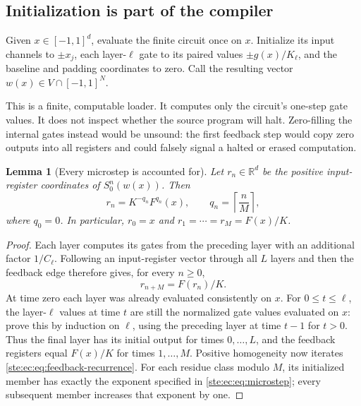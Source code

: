 \documentclass[11pt,letterpaper]{article}
\newtheorem{lemma}[theorem]{Lemma}
\theoremstyle{definition}
\theoremstyle{remark}
\newcommand{\R}{\mathbb R}
\begin{document}
\subsection{Initialization is part of the compiler}

Given $x\in[-1,1]^d$, evaluate the finite circuit once on $x$. Initialize
its input channels to $\pm x_j$, each layer-$\ell$ gate to its paired
values $\pm g(x)/K_\ell$, and the baseline and padding coordinates to
zero. Call the resulting vector $w(x)\in V\cap[-1,1]^N$.

This is a finite, computable loader. It computes only the circuit's
one-step gate values. It does not inspect whether the source program will
halt. Zero-filling the internal gates instead would be unsound: the first
feedback step would copy zero outputs into all registers and could falsely
signal a halted or erased computation.

\begin{lemma}[Every microstep is accounted for]
\label{ste:ec:lem:pipeline}
Let $r_n\in\R^d$ be the positive input-register coordinates of
$S_0^n(w(x))$. Then
\begin{equation}
 r_n=K^{-q_n}F^{q_n}(x),\qquad
 q_n=\left\lceil\frac nM\right\rceil,
 \label{ste:ec:eq:microstep}
\end{equation}
where $q_0=0$. In particular,
$r_0=x$ and $r_1=\cdots=r_M=F(x)/K$.
\end{lemma}

\begin{proof}
Each layer computes its gates from the preceding layer with an additional
factor $1/C_\ell$. Following an input-register vector through all $L$
layers and then the feedback edge therefore gives, for every $n\geq0$,
\begin{equation}
 r_{n+M}=F(r_n)/K.
 \label{ste:ec:eq:feedback-recurrence}
\end{equation}
At time zero each layer was already evaluated consistently on $x$.
For $0\leq t\leq\ell$, the layer-$\ell$ values at time $t$ are still the
normalized gate values evaluated on $x$: prove this by induction on
$\ell$, using the preceding layer at time $t-1$ for $t>0$.
Thus the final layer has its initial output for times $0,\ldots,L$, and
the feedback registers equal $F(x)/K$ for times $1,\ldots,M$.
Positive homogeneity now iterates \eqref{ste:ec:eq:feedback-recurrence}.
For each residue class modulo $M$, its initialized member has exactly
the exponent specified in \eqref{ste:ec:eq:microstep}; every subsequent member
increases that exponent by one.
\end{proof}
\end{document}
